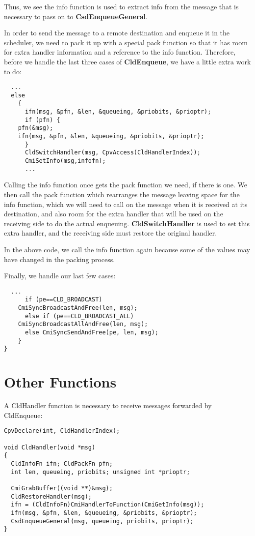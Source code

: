 Thus, we see the info function is used to extract info from the
message that is necessary to pass on to {\bf CsdEnqueueGeneral}.

In order to send the message to a remote destination and enqueue it in
the scheduler, we need to pack it up with a special pack function so
that it has room for extra handler information and a reference to the
info function.  Therefore, before we handle the last three cases of
{\bf CldEnqueue}, we have a little extra work to do:

\begin{verbatim}
  ...
  else
    {
      ifn(msg, &pfn, &len, &queueing, &priobits, &prioptr);
      if (pfn) {
	pfn(&msg);
	ifn(msg, &pfn, &len, &queueing, &priobits, &prioptr);
      }
      CldSwitchHandler(msg, CpvAccess(CldHandlerIndex));
      CmiSetInfo(msg,infofn);
      ...
\end{verbatim}

Calling the info function once gets the pack function we need, if
there is one.  We then call the pack function which rearranges the
message leaving space for the info function, which we will need to
call on the message when it is received at its destination, and also
room for the extra handler that will be used on the receiving side to
do the actual enqueuing.  {\bf CldSwitchHandler} is used to set this extra
handler, and the receiving side must restore the original handler.

In the above code, we call the info function again because some of the
values may have changed in the packing process.  

Finally, we handle our last few cases:

\begin{verbatim}
  ...
      if (pe==CLD_BROADCAST) 
	CmiSyncBroadcastAndFree(len, msg);
      else if (pe==CLD_BROADCAST_ALL)
	CmiSyncBroadcastAllAndFree(len, msg);
      else CmiSyncSendAndFree(pe, len, msg);
    }
}
\end{verbatim}

\section{Other Functions}

A CldHandler function is necessary to receive messages forwarded by
CldEnqueue:

\begin{verbatim}
CpvDeclare(int, CldHandlerIndex);

void CldHandler(void *msg)
{
  CldInfoFn ifn; CldPackFn pfn;
  int len, queueing, priobits; unsigned int *prioptr;
  
  CmiGrabBuffer((void **)&msg);
  CldRestoreHandler(msg);
  ifn = (CldInfoFn)CmiHandlerToFunction(CmiGetInfo(msg));
  ifn(msg, &pfn, &len, &queueing, &priobits, &prioptr);
  CsdEnqueueGeneral(msg, queueing, priobits, prioptr);
}
\end{verbatim}

